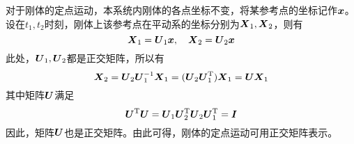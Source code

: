 对于刚体的定点运动，本系统内刚体的各点坐标不变，将某参考点的坐标记作$\boldsymbol{x}$。设在$t_1,t_2$时刻，刚体上该参考点在平动系的坐标分别为$\boldsymbol{X}_1,\boldsymbol{X}_2$，则有
\begin{equation*}
	\boldsymbol{X}_1 = \boldsymbol{U}_1 \boldsymbol{x},\quad \boldsymbol{X}_2 = \boldsymbol{U}_2 \boldsymbol{x}
\end{equation*}
此处，$\boldsymbol{U}_1,\boldsymbol{U}_2$都是正交矩阵，所以有
\begin{equation*}
	\boldsymbol{X}_2 = \boldsymbol{U}_2 \boldsymbol{U}_1^{-1} \boldsymbol{X}_1 = (\boldsymbol{U}_2 \boldsymbol{U}_1^{\mathrm{T}}) \boldsymbol{X}_1 = \boldsymbol{U} \boldsymbol{X}_1
\end{equation*}
其中矩阵$\boldsymbol{U}$满足
\begin{equation*}
	\boldsymbol{U}^{\mathrm{T}} \boldsymbol{U} = \boldsymbol{U}_1 \boldsymbol{U}_2^{\mathrm{T}} \boldsymbol{U}_2 \boldsymbol{U}_1^{\mathrm{T}} = \boldsymbol{I}
\end{equation*}
因此，矩阵$\boldsymbol{U}$也是正交矩阵。由此可得，刚体的定点运动可用正交矩阵表示。

\iffalse
\begin{example}[有限角位移的非对易性]

\begin{figure}[htb]
\centering
\begin{asy}
	size(200);
	//刚体的定轴转动
	pair O,n,R,RR;
	real theta,l,r,r1,r2;
	path cir;
	picture tmp;
	O = (0,0);
	theta = 70;
	n = dir(theta);
	l = 2;
	r = 0.8;
	r1 = -0.2;
	r2 = -0.05;
	draw(Label("$\boldsymbol{n}$",EndPoint),O--O+l*n,Arrow);
	cir = scale(r)*unitcircle;
	draw(tmp,cir);
	R = relpoint(cir,r1);
	RR = relpoint(cir,r2);
	draw(tmp,R--O--RR);
	draw(tmp,R--RR,red,Arrow);
	draw(tmp,Label(rotate(90-theta)*"$\phi$",EndPoint,Relative(E)),arc(O,0.2,degrees(R),degrees(RR)),Arrow);
	add(shift(2/3*l*n)*rotate(theta-90)*yscale(1/3)*tmp);
	R = shift(2/3*l*n)*rotate(theta-90)*yscale(1/3)*R;
	RR = shift(2/3*l*n)*rotate(theta-90)*yscale(1/3)*RR;
	//draw(R--2/3*l*n--RR);
	//draw(R--RR,red,Arrow);
	draw(Label("$\boldsymbol{R}$",MidPoint,Relative(E)),O--R,Arrow);
	draw(Label("$\boldsymbol{R}'$",MidPoint,Relative(E)),O--RR,Arrow);
	//draw(O--(1.3,0),invisible);
\end{asy}
\caption{刚体的定轴转动}
\label{刚体的定轴转动}
\end{figure}

考虑刚体绕指向为$\mbf{n}$的转动轴旋转$\theta$，即{\heiti 定轴转动}，如图\ref{刚体的定轴转动}所示。定轴转动是定点运动的特例，因此可用矩阵表示为
\begin{equation*}
	\mbf{X}' = \mbf{U}\mbf{X}
\end{equation*}
如果进行两次定轴转动（转轴指向可以不同），那么可有
\begin{equation*}
	\mbf{X}'' = \mbf{U}' \mbf{X}' = \mbf{U}' \mbf{U} \mbf{X}
\end{equation*}
由于矩阵的乘积具有不可交换性，因此有限角位移一般不具有对易性，因而不能用矢量表示。
\end{example}\fi

